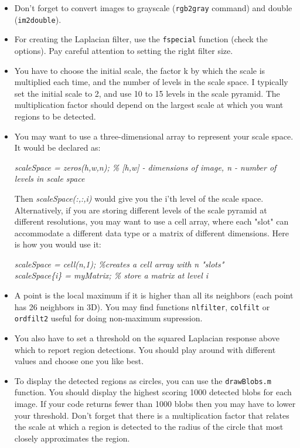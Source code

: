 \documentclass[10pt,letterpaper]{article}
\newcommand{\cmd}[1] {{\color{blue}\texttt{#1}}}
\begin{document}
\begin{itemize}
\item Don't forget to convert images to grayscale (\cmd{rgb2gray} command) and double (\cmd{im2double}).
\item For creating the Laplacian filter, use the \cmd{fspecial} function (check the options). Pay careful attention to setting the right filter size.
\item You have to choose the initial scale, the factor k by which the scale is multiplied each time, and the number of levels in the scale space. I typically set the initial scale to 2, and use 10 to 15 levels in the scale pyramid. The multiplication factor should depend on the largest scale at which you want regions to be detected.
\item You may want to use a three-dimensional array to represent your scale space. It would be declared as:

\begin{center}
\textit{scaleSpace = zeros(h,w,n); \% [h,w] - dimensions of image, n - number of levels in scale space}
\end{center}

Then \textit{scaleSpace(:,:,i)} would give you the i'th level of the scale space. Alternatively, if you are storing different levels of the scale pyramid at different resolutions, you may want to use a cell array, where each "slot" can accommodate a different data type or a matrix of different dimensions. Here is how you would use it:
\begin{center}
\textit{scaleSpace = cell(n,1); \%creates a cell array with n "slots"} \\
\textit{scaleSpace\{i\} = myMatrix; \% store a matrix at level i}
\end{center}

\item A point is the local maximum if it is higher than all its neighbors (each point has 26 neighbors in 3D). You may find functions \cmd{nlfilter}, \cmd{colfilt} or \cmd{ordfilt2} useful for doing non-maximum supression. 

\item You also have to set a threshold on the squared Laplacian response above which to report region detections. You should play around with different values and choose one you like best.

\item To display the detected regions as circles, you can use the \cmd{drawBlobs.m} function. You should display the highest scoring 1000 detected blobs for each image. If your code returns fewer than 1000 blobs then you may have to lower your threshold. Don't forget that there is a multiplication factor that relates the scale at which a region is detected to the radius of the circle that most closely approximates the region.
\end{itemize}
\end{document}
